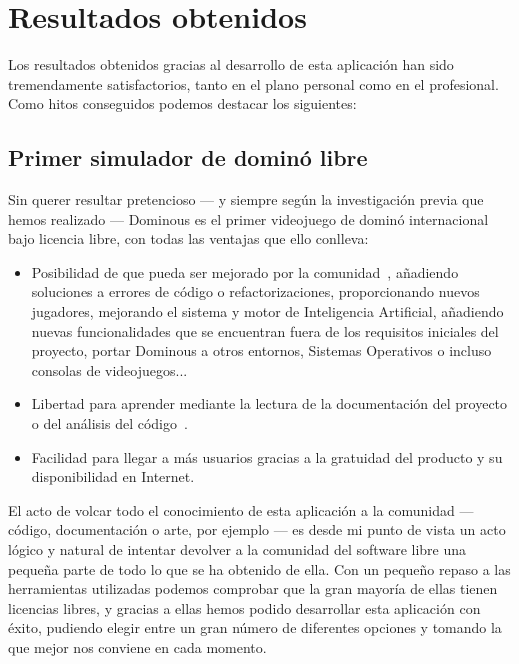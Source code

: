 

\section{Resultados obtenidos}

Los resultados obtenidos gracias al desarrollo de esta aplicación han sido tremendamente satisfactorios, tanto en el
plano personal como en el profesional. \\

Como hitos conseguidos podemos destacar los siguientes:

\subsection{Primer simulador de dominó libre}

Sin querer resultar pretencioso --- y siempre según la investigación previa que hemos realizado --- Dominous es el primer
videojuego de dominó internacional bajo licencia libre, con todas las ventajas que ello conlleva:

\begin{itemize}
    \item Posibilidad de que pueda ser mejorado por la comunidad~\cite{raymond01a}, añadiendo soluciones a errores de código o refactorizaciones, proporcionando nuevos jugadores, mejorando el sistema y motor de Inteligencia Artificial, añadiendo nuevas
        funcionalidades que se encuentran fuera de los requisitos iniciales del proyecto, portar Dominous a otros
        entornos, Sistemas Operativos o incluso consolas de videojuegos...
    \item Libertad para aprender mediante la lectura de la documentación del proyecto o del análisis del código~\cite{sobre_swlibre_2004}.
    \item Facilidad para llegar a más usuarios gracias a la gratuidad del producto y su disponibilidad en Internet.
\end{itemize}

El acto de volcar todo el conocimiento de esta aplicación a la comunidad --- código, documentación o arte, por ejemplo --- es desde
mi punto de vista un acto lógico y natural de intentar devolver a la comunidad del software libre una pequeña 
parte de todo lo que se ha obtenido de ella. Con un pequeño repaso a las herramientas utilizadas podemos comprobar
que la gran mayoría de ellas tienen licencias libres, y gracias a ellas hemos podido desarrollar esta aplicación con éxito,
pudiendo elegir entre un gran número de diferentes opciones y tomando la que mejor nos conviene en cada momento.


